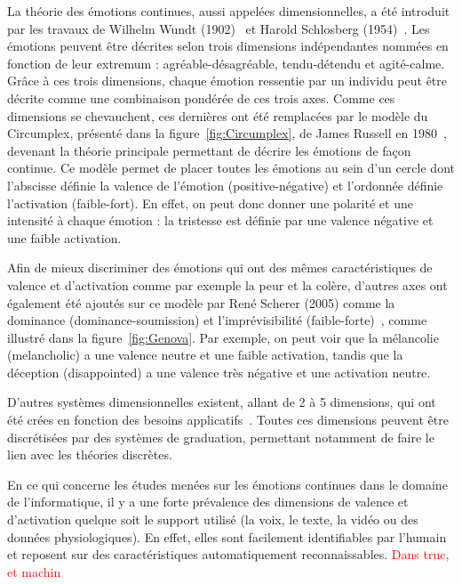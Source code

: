 La théorie des émotions continues, aussi appelées dimensionnelles, a été introduit par les travaux de Wilhelm Wundt (1902)~\cite{Wundt1902} et Harold Schlosberg (1954)~\cite{Schlosberg1954}. Les émotions peuvent être décrites selon trois dimensions indépendantes nommées en fonction de leur extremum : agréable-désagréable, tendu-détendu et agité-calme. Grâce à ces trois dimensions, chaque émotion ressentie par un individu peut être décrite comme une combinaison pondérée de ces trois axes.  Comme ces dimensions se chevauchent, ces dernières ont été remplacées par le modèle du Circumplex, présenté dans la figure~\ref{fig:Circumplex}, de James Russell en 1980~\cite{Russell1980}, devenant la théorie principale permettant de décrire les émotions de façon continue. Ce modèle permet de placer toutes les émotions au sein d'un cercle dont l'abscisse définie la valence de l'émotion (positive-négative) et l'ordonnée définie l'activation (faible-fort). En effet, on peut donc donner une polarité et une intensité à chaque émotion : la tristesse est définie par une valence négative et une faible activation.



Afin de mieux discriminer des émotions qui ont des mêmes caractéristiques de valence et d'activation comme par exemple la peur et la colère, d'autres axes ont également été ajoutés sur ce modèle par René Scherer (2005) comme la dominance (dominance-soumission) et l'imprévisibilité (faible-forte)~\cite{Scherer2005}, comme illustré dans la figure~\ref{fig:Genova}. Par exemple, on peut voir que la mélancolie (melancholic) a une valence neutre et une faible activation, tandis que la déception (disappointed) a une valence très négative et une activation neutre.


D'autres systèmes dimensionnelles existent, allant de 2 à 5 dimensions, qui ont été crées en fonction des besoins applicatifs~\cite{Mehrabian1980,Cochrane2009}. Toutes ces dimensions peuvent être discrétisées par des systèmes de graduation, permettant notamment de faire le lien avec les théories discrètes.

En ce qui concerne les études menées sur les émotions continues dans le domaine de l'informatique, il y a une forte prévalence des dimensions de valence et d'activation quelque soit le support utilisé (la voix, le texte, la vidéo ou des données physiologiques). En effet, elles sont facilement identifiables par l'humain et reposent sur des caractéristiques automatiquement reconnaissables.
\textcolor{red}{Dans truc, et machin }


